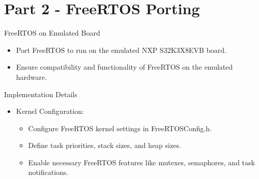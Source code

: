 
\section{Part 2 - FreeRTOS Porting}

\begin{frame}{FreeRTOS on Emulated Board}
    \begin{itemize}
        \item Port FreeRTOS to run on the emulated NXP S32K3X8EVB board.
        \item Ensure compatibility and functionality of FreeRTOS on the emulated hardware.
    \end{itemize}
\end{frame}

\begin{frame}{Implementation Details}
    \begin{itemize}
        \item Kernel Configuration:
        \begin{itemize}
            \item Configure FreeRTOS kernel settings in FreeRTOSConfig.h.
            \item Define task priorities, stack sizes, and heap sizes.
            \item Enable necessary FreeRTOS features like mutexes, semaphores, and task notifications.
        \end{itemize}
    \end{itemize}
\end{frame}
